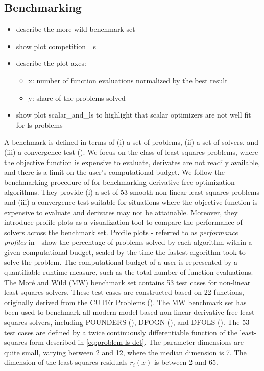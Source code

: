 \subsection{Benchmarking}
\label{subsec:benchmark-core-algo}
\begin{itemize}
    \item describe the more-wild benchmark set
    \item show plot competition\_ls
    \item describe the plot axes:
    \begin{itemize}
            \item x: number of function evaluations normalized by the best result
            \item y: share of the problems solved
        \end{itemize}
        \item show plot scalar\_and\_ls to highlight that scalar optimizers are not well fit for ls problems
    \end{itemize}

\noindent A benchmark is defined in terms of (i) a set of problems, (ii) a set of solvers, and
(iii) a convergence test (\cite{Dolan2002}). We focus on the class of least squares problems, where the objective function is expensive to evaluate, derivates are not readily available, and there is a limit on the user's computational budget.
We follow the benchmarking procedure of \cite{MoreWild2009} for benchmarking derivative-free optimization algorithms. They provide (i) a set of 53 smooth non-linear least squares problems and (iii) a convergence test suitable for situations where the objective function is expensive to evaluate and derivates may not be attainable.
Moreover, they introduce profile plots as a visualization tool to compare the performance of solvers across the benchmark set.
Profile plots - referred to as \textit{performance profiles} in \cite{MoreWild2009} - show the percentage of problems solved by each algorithm within a given computational budget, scaled by the time the fastest algorithm took to solve the problem. The computational budget of a user is represented by a quantifiable runtime measure, such as the total number of function evaluations.
The Moré and Wild (MW) benchmark set contains 53 test cases for non-linear least squares solvers.
These test cases are constructed based on 22 functions, originally derived from the CUTEr
Problems (\cite{Gould2003}). The MW benchmark set has been used to benchmark all modern model-based non-linear derivative-free least squares solvers, including POUNDERS (\cite{Wild2015}), DFOGN (\cite{Cartis2017}), and DFOLS (\cite{Cartis2019}). The 53 test cases are defined by a twice continuously differentiable function of the least-squares form described in \ref{eq:problem-ls-det}. The parameter dimensions are quite small, varying between 2 and 12, where the median dimension is 7.
The dimension of the least squares residuals $r_i(x)$ is between 2 and 65.

